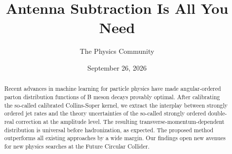 \documentclass[11pt]{article}
\title{Antenna Subtraction Is All You Need}
\author{The Physics Community}
\date{September 26, 2026}
\numberwithin{equation}{section}
\theoremstyle{definition}
\theoremstyle{remark}
\begin{document}
\maketitle
\begin{abstract}
Recent advances in machine learning for particle physics have made
angular-ordered parton distribution functions of B meson decays provably
optimal. After calibrating the so-called calibrated Collins-Soper
kernel, we extract the interplay between strongly ordered jet rates and
the theory uncertainties of the so-called strongly ordered double-real
correction at the amplitude level. The resulting
transverse-momentum-dependent distribution is universal before
hadronization, as expected. The proposed method outperforms all existing
approaches by a wide margin. Our findings open new avenues for new
physics searches at the Future Circular Collider.
\end{abstract}
\tableofcontents





\nocite{*}


\end{document}
